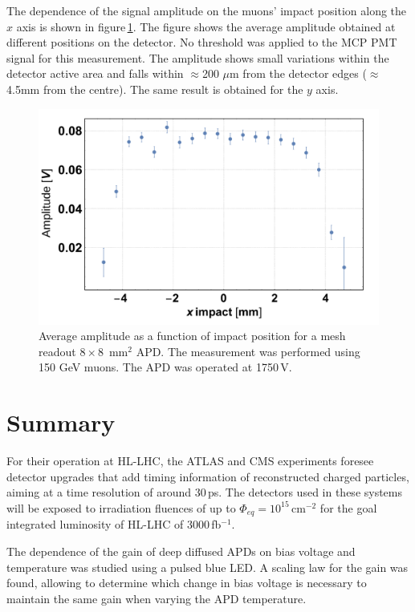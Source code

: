 \documentclass[3p,preprint,twocolumn]{elsarticle}
\begin{document}
The dependence of the signal amplitude on the muons' impact position along the $x$ axis is shown in figure\,\ref{fig:ampli8x8impact}.
The figure shows the average amplitude obtained at different positions on the detector.
No threshold was applied to the MCP PMT signal for this measurement.
The amplitude shows small variations within the detector active area and falls within $\approx$200 $\mu$m from the detector edges ($\approx$4.5mm from the centre).
The same result is obtained for the $y$ axis.
\begin{figure}
  \centering
  \includegraphics[width = \columnwidth]{ampli8x8vsImpact}
  \caption{Average amplitude as a function of impact position for a mesh readout $8 \times 8$~mm$^2$ APD. The measurement was performed using 150 GeV muons. The APD was operated at 1750\,V.}
  \label{fig:ampli8x8impact}
\end{figure}

\section{Summary}
\label{sec:summary}

For their operation at HL-LHC, the ATLAS and CMS experiments foresee detector upgrades that add timing information of reconstructed charged particles, aiming at a time resolution of around 30\,ps.
The detectors used in these systems will be exposed to irradiation fluences of up to $\Phi_{eq} = 10^{15}$\,cm$^{-2}$ for the goal integrated luminosity of HL-LHC of 3000\,fb$^{-1}$.

The dependence of the gain of deep diffused APDs on bias voltage and temperature was studied using a pulsed blue LED.
A scaling law for the gain was found, allowing to determine which change in bias voltage is necessary to maintain the same gain when varying the APD temperature.
\end{document}
